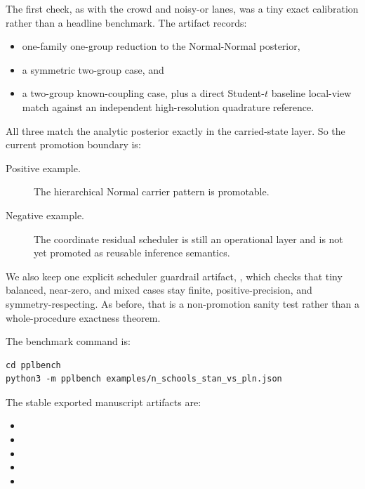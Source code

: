 \documentclass[11pt,openany]{report}
\begin{document}
The first check, as with the crowd and noisy-or lanes, was a tiny exact
calibration rather than a headline benchmark.  The artifact
 records:
\begin{itemize}
\item one-family one-group reduction to the Normal-Normal posterior,
\item a symmetric two-group case, and
\item a two-group known-coupling case, plus a direct Student-$t$ baseline
local-view match against an independent high-resolution quadrature reference.
\end{itemize}
All three match the analytic posterior exactly in the carried-state layer.
So the current promotion boundary is:
\begin{description}
\item[Positive example.] The hierarchical Normal carrier pattern is promotable.
\item[Negative example.] The coordinate residual scheduler is still an
operational layer and is not yet promoted as reusable inference semantics.
\end{description}

We also keep one explicit scheduler guardrail artifact,
, which checks
that tiny balanced, near-zero, and mixed cases stay finite, positive-precision,
and symmetry-respecting.  As before, that is a non-promotion sanity test rather
than a whole-procedure exactness theorem.

The benchmark command is:
\begin{lstlisting}
cd pplbench
python3 -m pplbench examples/n_schools_stan_vs_pln.json
\end{lstlisting}

The stable exported manuscript artifacts are:
\begin{itemize}
\item {}
\item {}
\item {}
\item {}
\item {}
\end{itemize}
\end{document}
